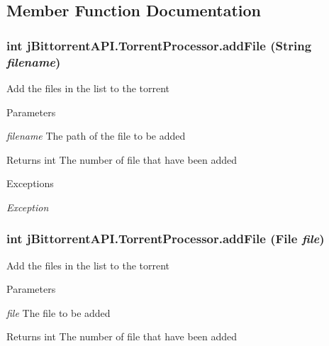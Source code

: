 \subsection{Member Function Documentation}
\hypertarget{classj_bittorrent_a_p_i_1_1_torrent_processor_a6ca859a5a72f7f16c32db57905fdc5df}{
\subsubsection[{addFile}]{\setlength{\rightskip}{0pt plus 5cm}int jBittorrentAPI.TorrentProcessor.addFile (String {\em filename})}}
\label{classj_bittorrent_a_p_i_1_1_torrent_processor_a6ca859a5a72f7f16c32db57905fdc5df}
Add the files in the list to the torrent 
\begin{DoxyParams}{Parameters}
\item[{\em filename}]The path of the file to be added \end{DoxyParams}
\begin{DoxyReturn}{Returns}
int The number of file that have been added 
\end{DoxyReturn}

\begin{DoxyExceptions}{Exceptions}
\item[{\em Exception}]\end{DoxyExceptions}
\hypertarget{classj_bittorrent_a_p_i_1_1_torrent_processor_a87892ae75b24a6316a37093bd3a77123}{
\subsubsection[{addFile}]{\setlength{\rightskip}{0pt plus 5cm}int jBittorrentAPI.TorrentProcessor.addFile (File {\em file})}}
\label{classj_bittorrent_a_p_i_1_1_torrent_processor_a87892ae75b24a6316a37093bd3a77123}
Add the files in the list to the torrent 
\begin{DoxyParams}{Parameters}
\item[{\em file}]The file to be added \end{DoxyParams}
\begin{DoxyReturn}{Returns}
int The number of file that have been added 
\end{DoxyReturn}

